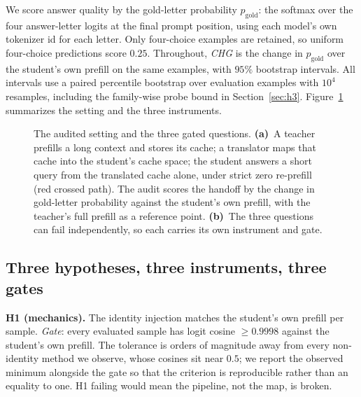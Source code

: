 \documentclass[10pt]{article}
\newcommand{\gold}{\ensuremath{p_{\mathrm{gold}}}}
\begin{document}
We score answer quality by the gold-letter probability $\gold$: the softmax over
the four answer-letter logits at the final prompt position, using each model's
own tokenizer id for each letter. Only four-choice examples are retained, so
uniform four-choice predictions score $0.25$. Throughout, \emph{CHG} is the change in
$\gold$ over the student's own prefill on the same examples, with $95\%$
bootstrap intervals. All intervals use a paired percentile bootstrap over
evaluation examples with $10^4$ resamples, including the family-wise probe
bound in Section~\ref{sec:h3}. Figure~\ref{fig:framework} summarizes the
setting and the three instruments.

\begin{figure}[t]
\centering

\caption{The audited setting and the three gated questions. \textbf{(a)}~A
teacher prefills a long context and stores its cache; a translator maps that
cache into the student's cache space; the student answers a short query from the
translated cache alone, under strict zero re-prefill (red crossed path). The
audit scores the handoff by the change in gold-letter probability against the
student's own prefill, with the teacher's full prefill as a reference point.
\textbf{(b)}~The three questions can fail independently, so each carries its own
instrument and gate.}
\label{fig:framework}
\end{figure}

\subsection{Three hypotheses, three instruments, three gates}
\textbf{H1 (mechanics).} The identity injection matches the student's own
prefill per sample. \emph{Gate}: every evaluated sample has logit cosine
$\ge 0.9998$ against the student's own prefill. The tolerance is orders of
magnitude away from every non-identity method we observe, whose cosines sit near
$0.5$; we report the observed minimum alongside the gate so that the criterion
is reproducible rather than an equality to one. H1 failing would mean the
pipeline, not the map, is broken.
\end{document}
